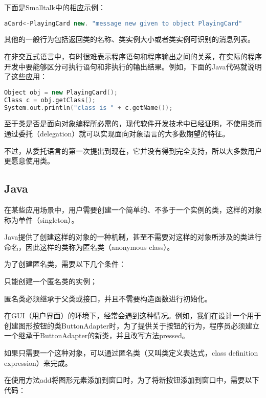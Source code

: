 下面是Smalltalk中的相应示例：

\begin{lstlisting}[language=C++]
aCard<-PlayingCard new. "message new given to object PlayingCard"
\end{lstlisting}

其他的一般行为包括返回类的名称、类实例大小或者类实例可识别的消息列表。

在非交互式语言中，有时很难表示程序语句和程序输出之间的关系，在实际的程序开发中要能够区分可执行语句和非执行的输出结果。例如，下面的Java代码就说明了这些应用：




\begin{lstlisting}[language=C++]
Object obj = new PlayingCard();
Class c = obj.getClass();
System.out.println("class is " + c.getName());
\end{lstlisting}

至于类是否是面向对象编程所必需的，现代软件开发技术中已经证明，不使用类而通过委托（delegation）就可以实现面向对象语言的大多数期望的特征。

不过，从委托语言的第一次提出到现在，它并没有得到完全支持，所以大多数用户更愿意使用类。


\subsection{Java}

在某些应用场景中，用户需要创建一个简单的、不多于一个实例的类，这样的对象称为单件（singleton）。


Java提供了创建这样的对象的一种机制，甚至不需要对这样的对象所涉及的类进行命名，因此这样的类称为匿名类（anonymous class）。

为了创建匿名类，需要以下几个条件：

\begin{compactenum}
\item 只能创建一个匿名类的实例；
\item 匿名类必须继承于父类或接口，并且不需要构造函数进行初始化。
\end{compactenum}

在GUI（用户界面）的环境下，经常会遇到这种情况。例如，我们在设计一个用于创建图形按钮的类ButtonAdapter时，为了提供关于按钮的行为，程序员必须建立一个继承于ButtonAdapter的新类，并且改写方法pressed。

如果只需要一个这种对象，可以通过匿名类（又叫类定义表达式，class definition expression）来完成。

在使用方法add将图形元素添加到窗口时，为了将新按钮添加到窗口中，需要以下代码：



